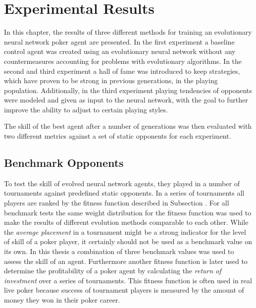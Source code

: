 

\chapter{Experimental Results}
\label{cha:results}

In this chapter, the results of three different methods for training an evolutionary neural network poker agent are presented. In the first experiment a baseline control agent was created using an evolutionary neural network without any countermeasures accounting for problems with evolutionary algorithms. In the second and third experiment a hall of fame was introduced to keep strategies, which have proven to be strong in previous generations, in the playing population. Additionally, in the third experiment playing tendencies of opponents were modeled and given as input to the neural network, with the goal to further improve the ability to adjust to certain playing styles. \par
The skill of the best agent after a number of generations was then evaluated with two different metrics against a set of static opponents for each experiment. 
\section{Benchmark Opponents}
To test the skill of evolved neural network agents, they played in a number of tournaments against predefined static opponents. In a series of tournaments all players are ranked by the fitness function described in Subsection . For all benchmark tests the same weight distribution for the fitness function was used to make the results of different evolution methods comparable to each other. While the \textit{average placement} in a tournament might be a strong indicator for the level of skill of a poker player, it certainly should not be used as a benchmark value on its own. In this thesis a combination of three benchmark values was used to assess the skill of an agent. Furthermore another fitness function is later used to determine the profitability of a poker agent by calculating the \textit{return of investment} over a series of tournaments. This fitness function is often used in real live poker because success of tournament players is measured by the amount of money they won in their poker career.

